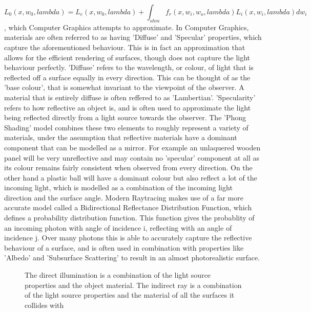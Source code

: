 \documentclass[ %
                    author={Gavin Parker},
                supervisor={Dr. Neill Campbell},
                    degree={MEng},
                     title={Deep Siamese Networks for Illumination Estimation from Stereo Images},
                  subtitle={},
                      type={research},
                      year={2018} ]{dissertation}
\begin{document}
\[L_0(x, w_0, lambda) = L_e(x, w_0, lambda) + \int_{ohm}{f_r(x, w_i, w_o,lambda)L_i(x, w_i, lambda)dw_i}\],
which Computer Graphics attempts to approximate.
\newline
In Computer Graphics, materials are often referred to as having 'Diffuse' and 'Specular' properties, which capture the aforementioned behaviour. This is in fact an approximation that allows for the efficient rendering of surfaces, though does not capture the light behaviour perfectly. 'Diffuse' refers to the wavelength, or colour, of light that is reflected off a surface equally in every direction. This can be thought of as the 'base colour', that is somewhat invariant to the viewpoint of the observer. A material that is entirely diffuse is often reffered to as 'Lambertian'. 'Specularity' refers to how reflective an object is, and is often used to approximate the light being reflected directly from a light source towards the observer. The 'Phong Shading' model combines these two elements to roughly represent a variety of materials, under the assumption that reflective materials have a dominant component that can be modelled as a mirror. For example an unlaquered wooden panel will be very unreflective and may contain no 'specular' component at all as its colour remains fairly consistent when observed from every direction. On the other hand a plastic ball will have a dominant colour but also reflect a lot of the incoming light, which is modelled as a combination of the incoming light direction and the surface angle. Modern Raytracing makes use of a far more accurate model called a Bidirectional Reflectance Distribution Function, which defines a probability distribution function. This function gives the probablity of an incoming photon with angle of incidence i, reflecting with an angle of incidence j. Over many photons this is able to accurately capture the reflective behaviour of a surface, and is often used in combination with properties like 'Albedo' and 'Subsurface Scattering' to result in an almost photorealistic surface.
\begin{center}
\begin{figure}
\label{raytracing}
\caption{The direct illumination is a combination of the light source properties and the object material. The indirect ray is a combination of the light source properties and the material of all the surfaces it collides with}
\end{figure}
\end{center}
\end{document}
